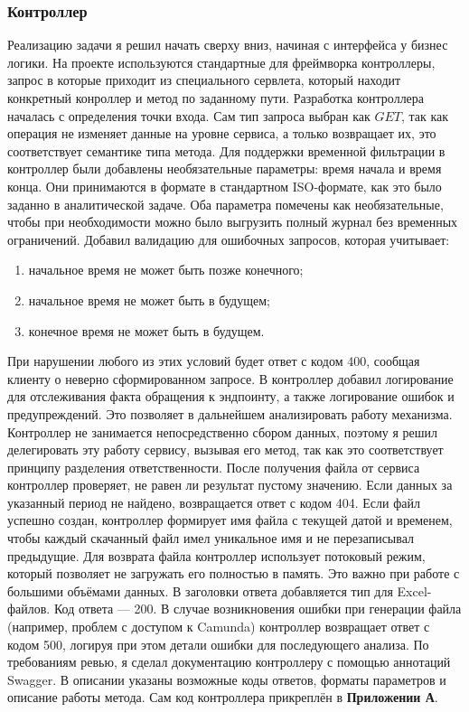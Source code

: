 \subsubsection{Контроллер}

Реализацию задачи я решил начать сверху вниз, начиная с интерфейса у бизнес логики. 
На проекте используются стандартные для фреймворка контроллеры, запрос в которые приходит из специального сервлета, который находит конкретный конроллер и метод по заданному пути.
Разработка контроллера началась с определения точки входа. Сам тип запроса выбран как $GET$, так как операция не изменяет данные на уровне сервиса, а только возвращает их, это соответствует семантике типа метода.
Для поддержки временной фильтрации в контроллер были добавлены необязательные параметры: время начала и время конца. 
Они принимаются в формате в стандартном ISO-формате, как это было заданно в аналитической задаче. 
Оба параметра помечены как необязательные, чтобы при необходимости можно было выгрузить полный журнал без временных ограничений.
Добавил валидацию для ошибочных запросов, которая учитывает:
\begin{enumerate}
  \item начальное время не может быть позже конечного;
  \item начальное время не может быть в будущем;
  \item конечное время не может быть в будущем.
\end{enumerate}
При нарушении любого из этих условий будет ответ с кодом 400, сообщая клиенту о неверно сформированном запросе.
В контроллер добавил логирование для отслеживания факта обращения к эндпоинту, а также логирование ошибок и предупреждений. 
Это позволяет в дальнейшем анализировать работу механизма.
Контроллер не занимается непосредственно сбором данных, поэтому я решил делегировать эту работу сервису, вызывая его метод, так как это соответствует принципу разделения ответственности.
После получения файла от сервиса контроллер проверяет, не равен ли результат пустому значению. 
Если данных за указанный период не найдено, возвращается ответ с кодом 404. 
Если файл успешно создан, контроллер формирует имя файла с текущей датой и временем, 
чтобы каждый скачанный файл имел уникальное имя и не перезаписывал предыдущие.
Для возврата файла контроллер использует потоковый режим, который позволяет не загружать его полностью в память. 
Это важно при работе с большими объёмами данных. В заголовки ответа добавляется тип для Excel-файлов. Код ответа — 200.
В случае возникновения ошибки при генерации файла (например, проблем с доступом к Camunda) контроллер возвращает ответ с кодом 500, 
логируя при этом детали ошибки для последующего анализа.
По требованиям ревью, я сделал документацию контроллеру с помощью аннотаций Swagger. 
В описании указаны возможные коды ответов, форматы параметров и описание работы метода.
Сам код контроллера прикреплён в \textbf{Приложении А}.

